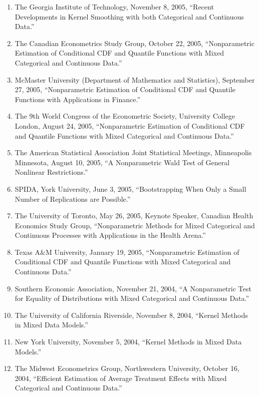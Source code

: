 \documentclass[
]{article}
\begin{document}
\begin{enumerate}
  New York Econometrics Camp I, February 4, 2006, ``Nonparametric
  Estimation of Conditional CDF and Quantile Functions with Applications
  in Finance.''
\item
  The Georgia Institute of Technology, November 8, 2005, ``Recent
  Developments in Kernel Smoothing with both Categorical and Continuous
  Data.''
\item
  The Canadian Econometrics Study Group, October 22, 2005,
  ``Nonparametric Estimation of Conditional CDF and Quantile Functions
  with Mixed Categorical and Continuous Data.''
\item
  McMaster University (Department of Mathematics and Statistics),
  September 27, 2005, ``Nonparametric Estimation of Conditional CDF and
  Quantile Functions with Applications in Finance.''
\item
  The 9th World Congress of the Econometric Society, University College
  London, August 24, 2005, ``Nonparametric Estimation of Conditional CDF
  and Quantile Functions with Mixed Categorical and Continuous Data.''
\item
  The American Statistical Association Joint Statistical Meetings,
  Minneapolis Minnesota, August 10, 2005, ``A Nonparametric Wald Test of
  General Nonlinear Restrictions.''
\item
  SPIDA, York University, June 3, 2005, ``Bootstrapping When Only a
  Small Number of Replications are Possible.''
\item
  The University of Toronto, May 26, 2005, Keynote Speaker, Canadian
  Health Economics Study Group, ``Nonparametric Methods for Mixed
  Categorical and Continuous Processes with Applications in the Health
  Arena.''
\item
  Texas A\&M University, January 19, 2005, ``Nonparametric Estimation of
  Conditional CDF and Quantile Functions with Mixed Categorical and
  Continuous Data.''
\item
  Southern Economic Association, November 21, 2004, ``A Nonparametric
  Test for Equality of Distributions with Mixed Categorical and
  Continuous Data.''
\item
  The University of California Riverside, November 8, 2004, ``Kernel
  Methods in Mixed Data Models.''
\item
  New York University, November 5, 2004, ``Kernel Methods in Mixed Data
  Models.''
\item
  The Midwest Econometrics Group, Northwestern University, October 16,
  2004, ``Efficient Estimation of Average Treatment Effects with Mixed
  Categorical and Continuous Data.''

\end{enumerate}
\end{document}
